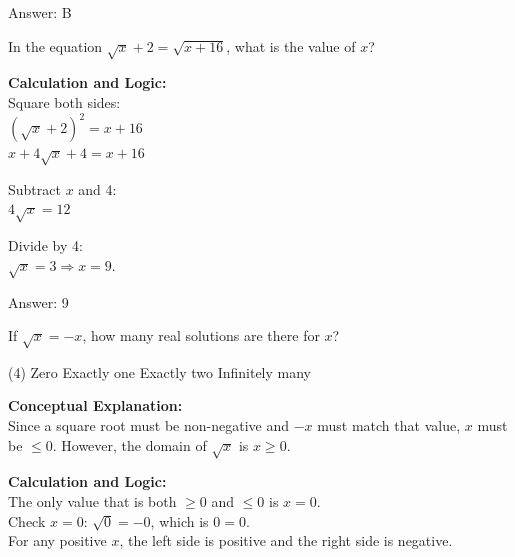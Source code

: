 \documentclass[11pt,paper=a4,answers]{exam}
\begin{document}
\begin{questions}
\begin{solution}
\vspace{25pt}

Answer: \colorbox{yellow!100}{B}
\end{solution}

\vspace{40pt}

\question
In the equation $\sqrt{x} + 2 = \sqrt{x + 16}$, what is the value of $x$?

\begin{solution}
\textbf{Calculation and Logic:} \\
Square both sides: \\
$(\sqrt{x} + 2)^2 = x + 16$ \\
$x + 4\sqrt{x} + 4 = x + 16$

\vspace{10pt}

Subtract $x$ and 4: \\
$4\sqrt{x} = 12$

\vspace{10pt}

Divide by 4: \\
$\sqrt{x} = 3 \Rightarrow x = 9$.

\vspace{25pt}

Answer: \colorbox{yellow!100}{9}
\end{solution}

\vspace{40pt}

\question
If $\sqrt{x} = -x$, how many real solutions are there for $x$?
\begin{tasks}(4)
    \task Zero
    \task Exactly one
    \task Exactly two
    \task Infinitely many
\end{tasks}

\begin{solution}
\textbf{Conceptual Explanation:} \\
Since a square root must be non-negative and $-x$ must match that value, $x$ must be $\leq 0$. However, the domain of $\sqrt{x}$ is $x \geq 0$.

\vspace{20pt}

\textbf{Calculation and Logic:} \\
The only value that is both $\geq 0$ and $\leq 0$ is $x = 0$. \\
Check $x = 0$: $\sqrt{0} = -0$, which is $0 = 0$. \\
For any positive $x$, the left side is positive and the right side is negative.


\end{solution}
\end{questions}
\end{document}

